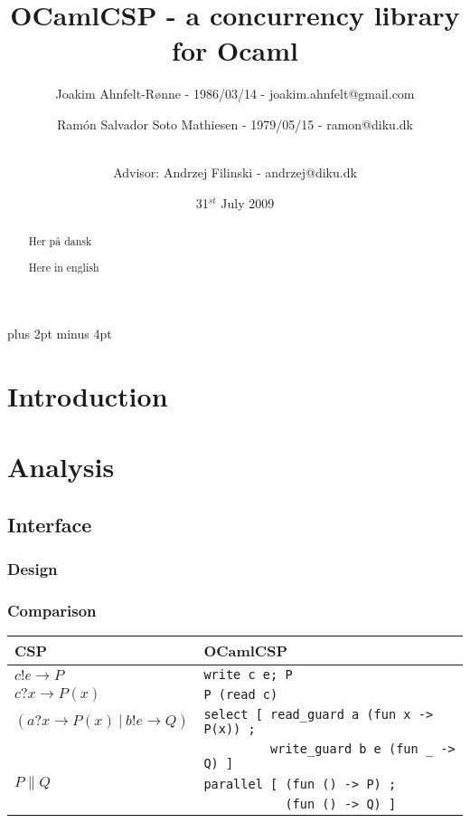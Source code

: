 \documentclass[a4paper,12pt]{article}
\title{OCamlCSP - a concurrency library for Ocaml}
\author{Joakim Ahnfelt-Rønne - 1986/03/14 - joakim.ahnfelt@gmail.com \and 
        Ramón Salvador Soto Mathiesen - 1979/05/15 - ramon@diku.dk \and
        \\ Advisor: Andrzej Filinski - andrzej@diku.dk}
\date{31$^{st}$ July 2009}
\begin{document}
\maketitle

\newpage

\begin{abstract}
Her på dansk
\end{abstract}

\begin{abstract}
Here in english
\end{abstract}

\newpage
\tableofcontents
\newpage

\parindent=0pt
\parskip=8pt plus 2pt minus 4pt

\section{Introduction}

\section{Analysis}

\subsection{Interface}

\subsubsection{Design}

\subsubsection{Comparison}

\begin{tabular}{l|l}
CSP & OCamlCSP \\
\hline
$c!e \to P$ & \texttt{write c e; P} \\
\hline
$c?x \to P(x)$ & \texttt{P (read c)} \\
\hline
$(a?x \to P(x)\ |\ b!e \to Q)$ 
&\verb|select [ read_guard a (fun x -> P(x)) ;| \\
&\verb|         write_guard b e (fun _ -> Q) ]|\\
\hline
$P \parallel Q$ 
&\verb|parallel [ (fun () -> P) ;| \\
&\verb|           (fun () -> Q) ]| \\
\end{tabular}
\end{document}
